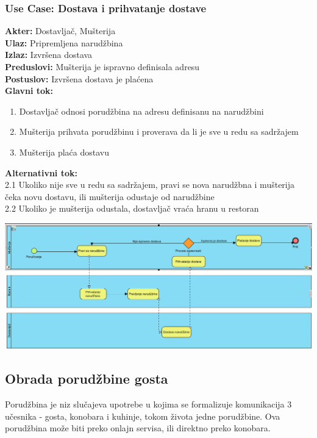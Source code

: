 \documentclass{article}
\begin{document}
       
\subsubsection{\textbf{Use Case}: Dostava i prihvatanje dostave}
\textbf{Akter:} Dostavljač, Mušterija\\
\textbf{Ulaz:} Pripremljena narudžbina\\
\textbf{Izlaz:} Izvršena dostava\\
\textbf{Preduslovi:} Mušterija je ispravno definisala adresu\\
\textbf{Postuslov:}  Izvršena dostava je plaćena\\
\textbf{Glavni tok:}
\begin{enumerate}
\item Dostavljač odnosi porudžbina na adresu definisanu na narudžbini
\item Mušterija prihvata porudžbinu i proverava da li je sve u redu sa sadržajem
\item Mušterija plaća dostavu
\end{enumerate}
\textbf{Alternativni tok:}\\
       2.1 Ukoliko nije sve u redu sa sadržajem, pravi se nova narudžbna i mušterija čeka novu dostavu, ili mušterija odustaje od narudžbine\\
       2.2 Ukoliko je mušterija odustala, dostavljač vraća hranu u restoran

\includegraphics[width=\textwidth]{SU_6_dostava_bpmn.png}


\subsection {Obrada porudžbine gosta}
Porudžbina je niz slučajeva upotrebe u kojima se formalizuje komunikacija 3 učesnika - gosta, konobara i kuhinje, tokom života jedne porudžbine. Ova porudžbina može biti preko onlajn servisa, ili direktno preko konobara.
\end{document}

